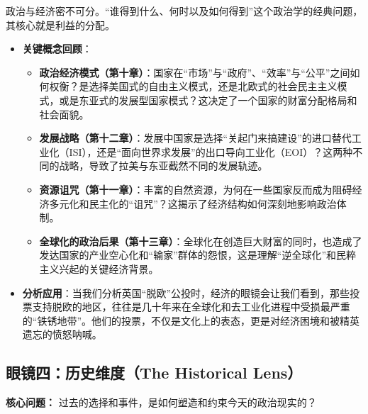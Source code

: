政治与经济密不可分。“谁得到什么、何时以及如何得到”这个政治学的经典问题，其核心就是利益的分配。
\begin{itemize}
    \item \textbf{关键概念回顾}：
    \begin{itemize}
        \item \textbf{政治经济模式（第十章）}：国家在“市场”与“政府”、“效率”与“公平”之间如何权衡？是选择美国式的自由主义模式，还是北欧式的社会民主主义模式，或是东亚式的发展型国家模式？这决定了一个国家的财富分配格局和社会面貌。
        \item \textbf{发展战略（第十二章）}：发展中国家是选择“关起门来搞建设”的进口替代工业化（ISI），还是“面向世界求发展”的出口导向工业化（EOI）？这两种不同的战略，导致了拉美与东亚截然不同的发展轨迹。
        \item \textbf{资源诅咒（第十一章）}：丰富的自然资源，为何在一些国家反而成为阻碍经济多元化和民主化的“诅咒”？这揭示了经济结构如何深刻地影响政治体制。
        \item \textbf{全球化的政治后果（第十三章）}：全球化在创造巨大财富的同时，也造成了发达国家的产业空心化和“输家”群体的怨恨，这是理解“逆全球化”和民粹主义兴起的关键经济背景。
    \end{itemize}
    \item \textbf{分析应用}：当我们分析英国“脱欧”公投时，经济的眼镜会让我们看到，那些投票支持脱欧的地区，往往是几十年来在全球化和去工业化进程中受损最严重的“铁锈地带”。他们的投票，不仅是文化上的表态，更是对经济困境和被精英遗忘的愤怒呐喊。
\end{itemize}

\subsection{眼镜四：历史维度（The Historical Lens）}
\textbf{核心问题：} 过去的选择和事件，是如何塑造和约束今天的政治现实的？

